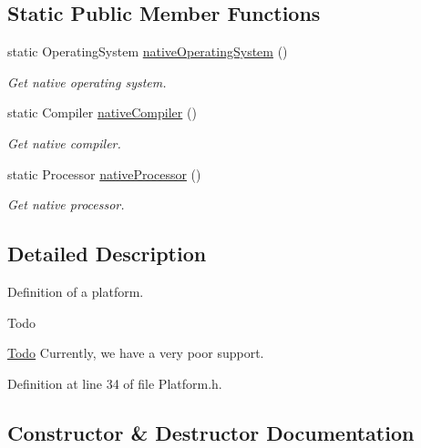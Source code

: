\subsection*{Static Public Member Functions}
\begin{DoxyCompactItemize}
\item 
static Operating\+System \hyperlink{class_mdt_1_1_deploy_utils_1_1_platform_aa9c466ca43cea94e751b73f8270fe4bb}{native\+Operating\+System} ()
\begin{DoxyCompactList}\small\item\em Get native operating system. \end{DoxyCompactList}\item 
static Compiler \hyperlink{class_mdt_1_1_deploy_utils_1_1_platform_aeca6535d32ac63294f3f8dfcb9b996a7}{native\+Compiler} ()
\begin{DoxyCompactList}\small\item\em Get native compiler. \end{DoxyCompactList}\item 
static Processor \hyperlink{class_mdt_1_1_deploy_utils_1_1_platform_afcf216e9f71ad3df91588dd1e96e05ee}{native\+Processor} ()
\begin{DoxyCompactList}\small\item\em Get native processor. \end{DoxyCompactList}\end{DoxyCompactItemize}


\subsection{Detailed Description}
Definition of a platform. 

\begin{DoxyRefDesc}{Todo}
\item[\hyperlink{todo__todo000005}{Todo}]Currently, we have a very poor support. \end{DoxyRefDesc}


Definition at line 34 of file Platform.\+h.



\subsection{Constructor \& Destructor Documentation}
